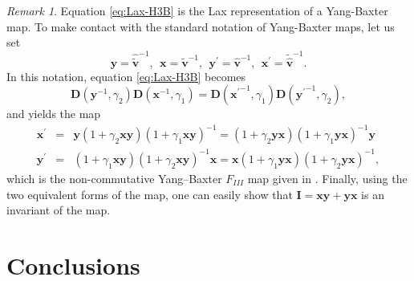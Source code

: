 \documentclass[dvips,10pt]{article}
\newcommand{\bs}{\boldsymbol}
\newcommand{\bsx}{ {\bs{x}}}
\newcommand{\bsy}{ {\bs{y}}}
\newcommand{\bsv}{ {\bs{v}}}
\theoremstyle{remark} %
\newtheorem{remark}{Remark}
\begin{document}
	\begin{remark}
		Equation \eqref{eq:Lax-H3B} is the Lax representation of a Yang-Baxter map. To make contact with the standard notation of Yang-Baxter maps, let us set
		$$\bsy = {\hat{\tilde{\bsv}}}^{-1}, ~~ \bsx = {\tilde{\bsv}}^{-1}, ~~ {\bsy^\prime} = \hat{\bsv}^{-1}, ~~ {\bsx^\prime} = {\tilde{\hat{\bsv}}}^{-1}.$$
		In this notation, equation \eqref{eq:Lax-H3B} becomes 
		$$ 	{\bs{D}}(\bsy^{-1},\gamma_2) {\bs{D}}(\bsx^{-1},\gamma_1)  = {\bs{D}}({\bsx^\prime}^{-1},\gamma_1) {\bs{D}}({\bsy^\prime}^{-1},\gamma_2),$$
		and yields the map
		\begin{subequations}
			\begin{eqnarray}
				\bsx^\prime &=& \bsy \left(1 + \gamma_2 \bsx \bsy \right)  \left(1 + \gamma_1 \bsx \bsy \right)^{-1} =   \left(1 + \gamma_2 \bsy \bsx \right) \left(1 + \gamma_1 \bsy \bsx \right)^{-1}  \bsy \\
				\bsy^\prime &=&  \left(1 + \gamma_1 \bsx \bsy \right)  \left(1 + \gamma_2 \bsx \bsy \right)^{-1} \bsx  =   \bsx   \left(1 + \gamma_1 \bsy \bsx \right) \left(1 + \gamma_2 \bsy \bsx \right)^{-1},
			\end{eqnarray}
		\end{subequations}
		which is the non-commutative Yang--Baxter $F_{III}$ map given in \cite{Dol}. Finally, using the two equivalent forms of the map, one can easily show that ${\bs{I}} = \bsx \bsy + \bsy \bsx$ is an invariant of the map. 
	\end{remark}
	
	
	
	\section{Conclusions} \label{sec:con}
	
\end{document}
